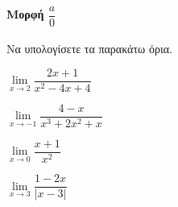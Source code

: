\documentclass[11pt,a4paper,modern]{FFExercises}
\begin{document}
\paragraph{Μορφή $\dfrac{a}{0}$}
\askhsh Να υπολογίσετε τα παρακάτω όρια.
\begin{alist}
\item $\lim\limits_{x\to 2}{\dfrac{2x+1}{x^2-4x+4}}$
\item $\lim\limits_{x\to -1}{\dfrac{4-x}{x^3+2x^2+x}}$
\item $\lim\limits_{x\to 0}{\dfrac{x+1}{x^2}}$
\item $\lim\limits_{x\to 3}{\dfrac{1-2x}{|x-3|}}$
\end{alist}
\end{document}

